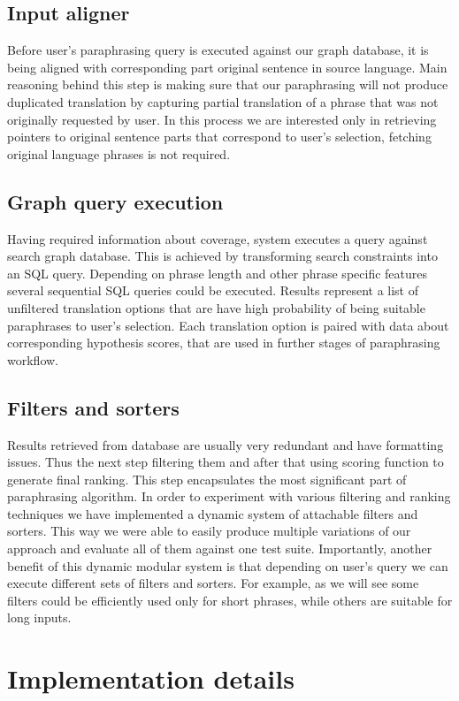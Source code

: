 \subsection{Input aligner}

Before user's paraphrasing query is executed against our graph database, it is being aligned with corresponding part original sentence in source language. Main reasoning behind this step is making sure that our paraphrasing will not produce duplicated translation by capturing partial translation of a phrase that was not originally requested by user. In this process we are interested only in retrieving pointers to original sentence parts that correspond to user's selection, fetching original language phrases is not required.

\subsection{Graph query execution}

Having required information about coverage, system executes a query against search graph database. This is achieved by transforming search constraints into an SQL query. Depending on phrase length and other phrase specific features several sequential SQL queries could be executed. Results represent a list of unfiltered translation options that are have high probability of being suitable paraphrases to user's selection. Each translation option is paired with data about corresponding hypothesis scores, that are used in further stages of paraphrasing workflow.

\subsection{Filters and sorters}

Results retrieved from database are usually very redundant and have formatting issues. Thus the next step filtering them and after that using scoring function to generate final ranking. This step encapsulates the most significant part of paraphrasing algorithm. In order to experiment with various filtering and ranking techniques we have implemented a dynamic system of attachable filters and sorters. This way we were able to easily produce multiple variations of our approach and evaluate all of them against one test suite. Importantly, another benefit of this dynamic modular system is that depending on user's query we can execute different sets of filters and sorters. For example, as we will see some filters could be efficiently used only for short phrases, while others are suitable for long inputs. 

\section{Implementation details}


